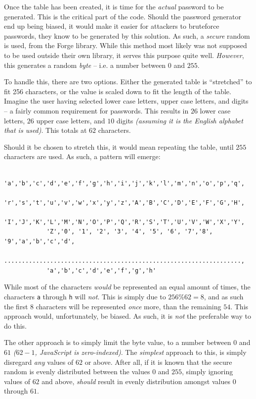 		Once the table has been created, it is time for the \emph{actual} password to be generated. This is the critical part of the code. Should the password generator end up being biased, it would make it easier for attackers to bruteforce passwords, they know to be generated by this solution. As such, a \emph{secure} random is used, from the Forge library. While this method most likely was not supposed to be used outside their own library, it serves this purpose quite well. \emph{However}, this generates a random \emph{byte} -- i.e. a number between $0$ and $255$.

		To handle this, there are two options. Either the generated table is ``stretched'' to fit 256 characters, or the value is scaled down to fit the length of the table. Imagine the user having selected lower case letters, upper case letters, and digits -- a fairly common requirement for passwords. This results in $26$ lower case letters, $26$ upper case letters, and $10$ digits \emph{(assuming it is the English alphabet that is used)}. This totals at $62$ characters.

		Should it be chosen to stretch this, it would mean repeating the table, until $255$ characters are used. As such, a pattern will emerge:
		\begin{verbatim}
			'a','b','c','d','e','f','g','h','i','j','k','l','m','n','o','p','q',
			'r','s','t','u','v','w','x','y','z','A','B','C','D','E','F','G','H',
			'I','J','K','L','M','N','O','P','Q','R','S','T','U','V','W','X','Y',
			'Z','0', '1', '2', '3', '4', '5', '6', '7','8', '9','a','b','c','d',
			...................................................................,
			'a','b','c','d','e','f','g','h'
		\end{verbatim}
		While most of the characters \emph{would} be represented an equal amount of times, the characters \verb=a= through \verb=h= will \emph{not}. This is simply due to $256\%62=8$, and as such the first $8$ characters will be represented \emph{once} more, than the remaining $54$. This approach would, unfortunately, be biased. As such, it is \emph{not} the preferable way to do this.

		The other approach is to simply limit the byte value, to a number between $0$ and $61$ \emph{($62-1$, JavaScript is zero-indexed)}. The \emph{simplest} approach to this, is simply disregard \emph{any} values of $62$ or above. After all, if it is known that the secure random is evenly distributed between the values $0$ and $255$, simply ignoring values of $62$ and above, \emph{should} result in evenly distribution amongst values $0$ through $61$. 

